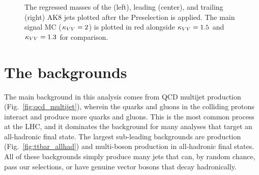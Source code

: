 \begin{figure}[htb]
    \centering
    \caption[The \ParticleNet regressed mass distribution for each of the three VBS \VVH AK8 jets]{
        The \ParticleNet regressed masses \MPNet of the \Htobb (left), leading \Vtoqq (center), and trailing \Vtoqq (right) AK8 jets plotted after the Preselection is applied. 
        The main signal MC ($\kappa_{VV} = 2$) is plotted in red alongside $\kappa_{VV} = 1.5$ and $\kappa_{VV} = 1.3$ for comparison. 
    }
    \label{fig:vbsvvh_fatjet_masses}
\end{figure}

\section{The backgrounds}
The main background in this analysis comes from QCD multijet production (Fig.~\ref{fig:qcd_multijet}), wherein the quarks and gluons in the colliding protons interact and produce more quarks and gluons. 
This is the most common process at the LHC, and it dominates the background for many analyses that target an all-hadronic final state. 
The largest sub-leading backgrounds are \ttbar production (Fig.~\ref{fig:ttbar_allhad}) and multi-boson production in all-hadronic final states. 
All of these backgrounds simply produce many jets that can, by random chance, pass our \Htobb selections, or have genuine vector bosons that decay hadronically. 

